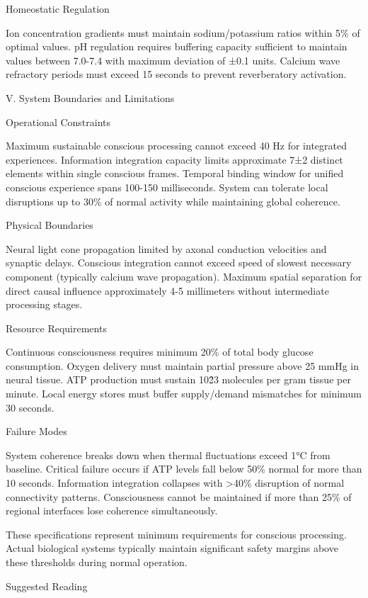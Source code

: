 Homeostatic Regulation

Ion concentration gradients must maintain sodium/potassium ratios within 5\% of optimal values. pH regulation requires buffering capacity sufficient to maintain values between 7.0-7.4 with maximum deviation of ±0.1 units. Calcium wave refractory periods must exceed 15 seconds to prevent reverberatory activation.

V. System Boundaries and Limitations

Operational Constraints

Maximum sustainable conscious processing cannot exceed 40 Hz for integrated experiences. Information integration capacity limits approximate 7±2 distinct elements within single conscious frames. Temporal binding window for unified conscious experience spans 100-150 milliseconds. System can tolerate local disruptions up to 30\% of normal activity while maintaining global coherence.

Physical Boundaries

Neural light cone propagation limited by axonal conduction velocities and synaptic delays. Conscious integration cannot exceed speed of slowest necessary component (typically calcium wave propagation). Maximum spatial separation for direct causal influence approximately 4-5 millimeters without intermediate processing stages.

Resource Requirements

Continuous consciousness requires minimum 20\% of total body glucose consumption. Oxygen delivery must maintain partial pressure above 25 mmHg in neural tissue. ATP production must sustain 10\^23 molecules per gram tissue per minute. Local energy stores must buffer supply/demand mismatches for minimum 30 seconds.

Failure Modes

System coherence breaks down when thermal fluctuations exceed 1°C from baseline. Critical failure occurs if ATP levels fall below 50\% normal for more than 10 seconds. Information integration collapses with >40\% disruption of normal connectivity patterns. Consciousness cannot be maintained if more than 25\% of regional interfaces lose coherence simultaneously.

These specifications represent minimum requirements for conscious processing. Actual biological systems typically maintain significant safety margins above these thresholds during normal operation.

Suggested Reading

